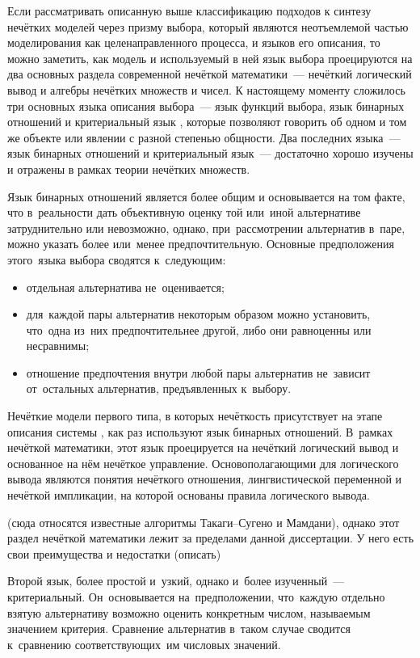 Если рассматривать описанную выше классификацию подходов к синтезу нечётких моделей через призму выбора, который являются неотъемлемой частью моделирования как целенаправленного процесса, и языков его описания, то можно заметить, как модель и используемый в ней язык выбора проецируются на два основных раздела современной нечёткой математики~--- нечёткий логический вывод и алгебры нечётких множеств и чисел. К настоящему моменту сложилось три основных языка описания выбора~--- язык функций выбора, язык бинарных отношений и критериальный язык \cite{Choice_Languages}, которые позволяют говорить об одном и том же объекте или явлении с разной степенью общности. Два последних языка~--- язык бинарных отношений и критериальный язык~--- достаточно хорошо изучены и отражены в рамках теории нечётких множеств.

Язык бинарных отношений является более общим и основывается на том факте, что в~реальности дать объективную оценку той или~иной альтернативе затруднительно или невозможно, однако, при~рассмотрении альтернатив в~паре, можно указать более или~менее предпочтительную. Основные предположения этого~языка выбора сводятся к~следующим:
\begin{itemize}
	\item отдельная альтернатива не~оценивается;
	\item для~каждой пары альтернатив некоторым образом можно установить, что~одна из~них предпочтительнее другой, либо они равноценны или несравнимы;
	\item отношение предпочтения внутри любой пары альтернатив не~зависит от~остальных альтернатив, предъявленных к~выбору.
\end{itemize}

Нечёткие модели первого типа, в которых нечёткость присутствует на этапе описания системы \cite{Choice_Languages}, как раз используют язык бинарных отношений. В~рамках нечёткой математики, этот язык проецируется на нечёткий логический вывод и основанное на нём нечёткое управление. Основополагающими для логического вывода являются понятия нечёткого отношения, лингвистической переменной и нечёткой импликации, на которой основаны правила логического вывода.

 (сюда относятся известные алгоритмы Такаги--Сугено и Мамдани), однако этот раздел нечёткой математики лежит за пределами данной диссертации. У него есть свои преимущества и недостатки (описать)

Второй язык, более простой и~узкий, однако и~более изученный~--- критериальный. Он~основывается на~предположении, что~каждую отдельно взятую альтернативу возможно оценить конкретным числом, называемым значением критерия. Сравнение альтернатив в~таком случае сводится к~сравнению соответствующих~им числовых значений.

